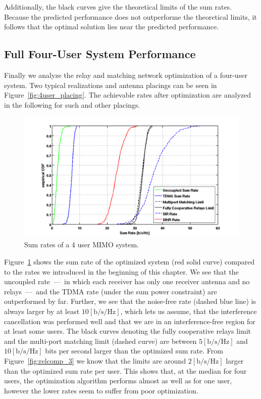 Additionally, the black curves give the theoretical limits of the sum rates.
Because the predicted performance does not outperforme the theoretical limits, it follows that the optimal solution lies near the predicted performance.


\subsection{Full Four-User System Performance}
\label{sec:4user_const}

Finally we analyze the relay and matching network optimization of a four-user system.
Two typical realizations and antenna placings can be seen in Figure~\ref{fig:4user_placing}.
The achievable rates after optimization are analyzed in the following for such and other placings.
\begin{figure}[h]
\centering
  \includegraphics[width=\linewidth]{images/4user_sumrate.png}
\caption{Sum rates of a 4 user MIMO system.}
\label{fig:4user_sumrate}
\end{figure}

Figure~\ref{fig:4user_sumrate} shows the sum rate of the optimized system (red solid curve) compared to the rates we introduced in the beginning of this chapter.
We see that the uncoupled rate~---~in which each receiver has only one receiver antenna and no relays~---~and the TDMA rate (under the sum power constraint) are outperformed by far.
Further, we see that the noise-free rate (dashed blue line) is always larger by at least  $10 \left[\text{b/s/Hz}\right]$, which lets us assume, that the interference cancellation was performed well and that we are in an interference-free region for at least some users.
The black curves denoting the fully cooperative relays limit and the multi-port matching limit (dashed curve) are between $5 \left[\text{b/s/Hz}\right]$ and $10 \left[\text{b/s/Hz}\right]$ bits per second larger than the optimized sum rate.
From Figure~\ref{fig:relcomp_3} we know that the limits are around $2 \left[\text{b/s/Hz}\right]$ larger than the optimized sum rate per user.
This shows that, at the median for four users, the optimization algorithm performs almost as well as for one user, however the lower rates seem to suffer from poor optimization.

